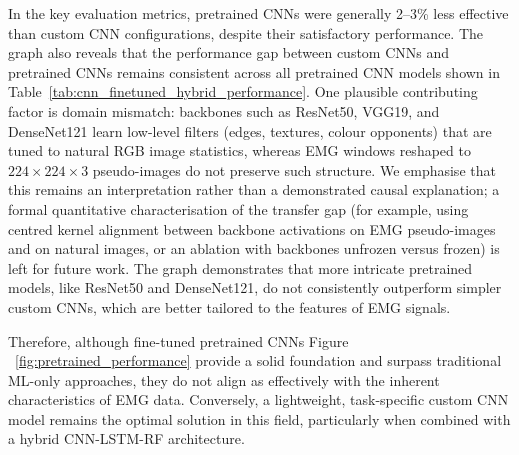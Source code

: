 \documentclass{elektr}
\newcommand{\yh}[1]{{\color{revhi}#1}}  %
\begin{document}
In the key evaluation metrics, pretrained CNNs were generally 2–3\% less effective than custom CNN configurations, despite their satisfactory performance. The graph also reveals that the performance gap between custom CNNs and pretrained CNNs remains consistent across all pretrained CNN models shown in Table~\ref{tab:cnn_finetuned_hybrid_performance}. \yh{One plausible contributing factor is domain mismatch: backbones such as ResNet50, VGG19, and DenseNet121 learn low-level filters (edges, textures, colour opponents) that are tuned to natural RGB image statistics, whereas EMG windows reshaped to $224\times224\times3$ pseudo-images do not preserve such structure. We emphasise that this remains an interpretation rather than a demonstrated causal explanation; a formal quantitative characterisation of the transfer gap (for example, using centred kernel alignment between backbone activations on EMG pseudo-images and on natural images, or an ablation with backbones unfrozen versus frozen) is left for future work.} The graph demonstrates that more intricate pretrained models, like ResNet50 and DenseNet121, do not consistently outperform simpler custom CNNs, which are better tailored to the features of EMG signals.

Therefore, although fine-tuned pretrained CNNs Figure ~\ref{fig:pretrained_performance} provide a solid foundation and surpass traditional ML-only approaches, they do not align as effectively with the inherent characteristics of EMG data. Conversely, a lightweight, task-specific custom CNN model remains the optimal solution in this field, particularly when combined with a hybrid CNN-LSTM-RF architecture.
\end{document}
